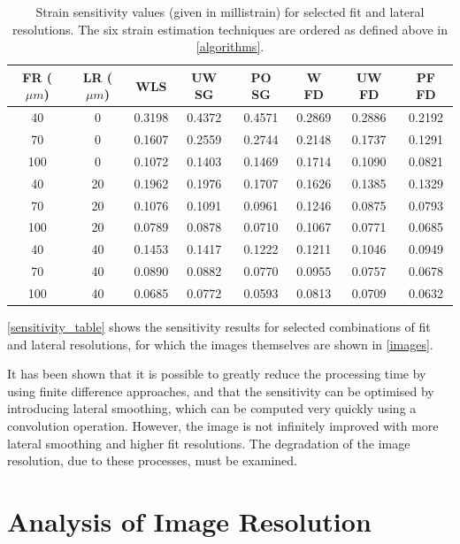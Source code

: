 \begin{table}[h]
	\begin{center}
		\begin{tabular}{|c||c||c|c|c|c|c|c|}
			\hline 
			FR ($\mu m$) & LR ($\mu m$) & WLS & UW SG & PO SG & W FD & UW FD & PF FD \\
			\hline
			\hline
			40 & 0 & 0.3198 & 0.4372 & 0.4571 & 0.2869 & 0.2886 & 0.2192 \\
			\hline
			70 & 0 & 0.1607 & 0.2559 & 0.2744 & 0.2148 & 0.1737 & 0.1291 \\
			\hline
			100 & 0 & 0.1072 & 0.1403 & 0.1469 & 0.1714 & 0.1090 & 0.0821 \\
			\hline
			40 & 20 & 0.1962 & 0.1976 & 0.1707 & 0.1626 & 0.1385 & 0.1329 \\
			\hline
			70 & 20 & 0.1076 & 0.1091 & 0.0961 & 0.1246 & 0.0875 & 0.0793 \\
			\hline
			100 & 20 & 0.0789 & 0.0878 & 0.0710 & 0.1067 & 0.0771 & 0.0685 \\
			\hline
			40 & 40 & 0.1453 & 0.1417 & 0.1222 & 0.1211 & 0.1046 & 0.0949 \\
			\hline
			70 & 40 & 0.0890 & 0.0882 & 0.0770 & 0.0955 & 0.0757 & 0.0678 \\
			\hline
			100 & 40 & 0.0685 & 0.0772 & 0.0593 & 0.0813 & 0.0709 & 0.0632 \\
			\hline
		\end{tabular}
	\end{center}
	\caption{Strain sensitivity values (given in millistrain) for selected fit and lateral resolutions. The six strain estimation techniques are ordered as defined above in \autoref{algorithms}.}
	\label{sensitivity_table}
\end{table}

\autoref{sensitivity_table} shows the sensitivity results for selected combinations of fit and lateral resolutions, for which the images themselves are shown in \autoref{images}.

It has been shown that it is possible to greatly reduce the processing time by using finite difference approaches, and that the sensitivity can be optimised by introducing lateral smoothing, which can be computed very quickly using a convolution operation. However, the image is not infinitely improved with more lateral smoothing and higher fit resolutions. The degradation of the image resolution, due to these processes, must be examined. 

\section{Analysis of Image Resolution} \label{image_res_results}

